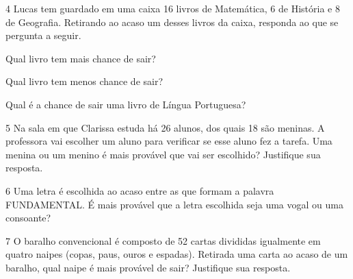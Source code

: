 \num{4} Lucas tem guardado em uma caixa 16 livros de Matemática, 6 de História e
8 de Geografia. Retirando ao acaso um desses livros da caixa, responda ao que se pergunta a seguir.

\begin{escolha}
\item
  Qual livro tem mais chance de sair?
\item{}

\item
  Qual livro tem menos chance de sair?
\item{}

\item
  Qual é a chance de sair uma livro de Língua Portuguesa?
\item{}
\end{escolha}

\pagebreak
\num{5} Na sala em que Clarissa estuda há 26 alunos, dos quais 18 são meninas. A
professora vai escolher um aluno para verificar se esse aluno fez a tarefa.
Uma menina ou um menino é mais provável que vai ser escolhido? Justifique sua resposta.

\begin{mdframed}[linewidth=2pt,linecolor=salmao,roundcorner=2pt]



\end{mdframed}

\num{6} Uma letra é escolhida ao acaso entre as que formam a palavra
FUNDAMENTAL. É mais provável que a letra escolhida seja uma vogal ou uma consoante?

\begin{mdframed}[linewidth=2pt,linecolor=salmao,roundcorner=2pt]



\end{mdframed}

\num{7} O baralho convencional é composto de 52 cartas divididas igualmente em quatro
naipes (copas, paus, ouros e espadas). Retirada uma carta ao acaso de um baralho,
qual naipe é mais provável de sair? Justifique sua resposta.

